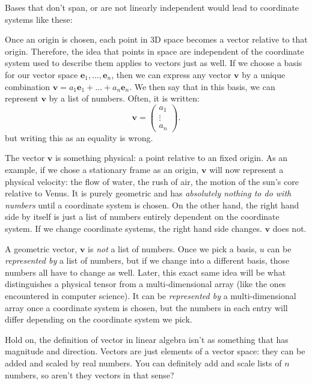 \documentclass[../master.tex]{subfiles}
\begin{document}
	Bases that don't span, or are not linearly independent would lead to coordinate systems like these:
	

	Once an origin is chosen, each point in 3D space becomes a vector relative to that origin. Therefore, the idea that points in space are independent of the coordinate system used to describe them applies to vectors just as well. If we choose a basis for our vector space $\mathbf e_1, \dots, \mathbf e_n$, then we can express any vector $\mathbf v$ by a unique combination $\mathbf v = a_1 \mathbf e_1 + \dots + a_n \mathbf e_n$. We then say that in this basis, we can represent $\mathbf v$ by a list of numbers. Often, it is written:
	\begin{equation*}
		\mathbf v = \begin{pmatrix} a_1 \\ \vdots \\a_n	\end{pmatrix}.
	\end{equation*}
	but writing this as an equality is wrong. 
	
	The vector $\mathbf v$ is something physical: a point relative to an fixed origin. As an example, if we chose a stationary frame as an origin, $\mathbf v$ will now represent a physical velocity: the flow of water, the rush of air, the motion of the sun's core relative to Venus. It is purely geometric and has \emph{absolutely nothing to do with numbers} until a coordinate system is chosen. On the other hand, the right hand side by itself is just a list of numbers entirely dependent on the coordinate system. If we change coordinate systems, the right hand side changes. $\mathbf v$ does not.
	
	A geometric vector, $\mathbf v$ is \emph{not} a list of numbers. Once we pick a basis, $u$ can be \emph{represented by} a list of numbers, but if we change into a different basis, those numbers all have to change as well. Later, this exact same idea will be what distinguishes a physical tensor from a multi-dimensional array (like the ones encountered in computer science). It can be \emph{represented by} a multi-dimensional array once a coordinate system is chosen, but the numbers in each entry will differ depending on the coordinate system we pick. 
	
	\begin{dialogue}
	Hold on, the definition of vector in linear algebra isn't as something that has magnitude and direction. Vectors are just elements of a vector space: they can be added and scaled by real numbers. You can definitely add and scale lists of $n$ numbers, so aren't they vectors in that sense?
	\end{dialogue}
	
\end{document}
